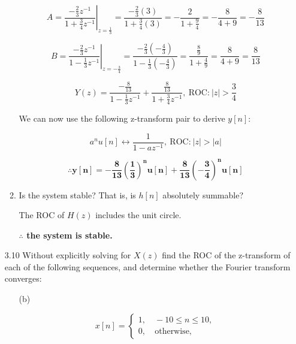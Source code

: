 \documentclass[fleqn]{article}
\begin{document}
\begin{enumerate}[nolistsep]
\begin{enumerate}[nolistsep]
				\begin{equation*}
					A = \left.\frac{-\frac{2}{3}z^{-1}}{1 + \frac{3}{4}z^{-1}}\right\vert_{z = \frac{1}{3}} = \frac{-\frac{2}{3}(3)}{1 + \frac{3}{4}(3)} = -\frac{2}{1 + \frac{9}{4}} = -\frac{8}{4 + 9} = -\frac{8}{13}
				\end{equation*}
					
				\begin{equation*}
					B = \left.\frac{-\frac{2}{3}z^{-1}}{1 - \frac{1}{3}z^{-1}}\right\vert_{z = -\frac{3}{4}} = \frac{-\frac{2}{3}\left(-\frac{4}{3}\right)}{1 - \frac{1}{3}\left(-\frac{4}{3}\right)} = \frac{\frac{8}{9}}{1 + \frac{4}{9}} = \frac{8}{4 + 9} = \frac{8}{13}
				\end{equation*}
				
				\pagebreak
				\begin{equation*}
					Y(z) = \frac{-\frac{8}{13}}{1 - \frac{1}{3}z^{-1}} + \frac{\frac{8}{13}}{1 + \frac{3}{4}z^{-1}},\ \text{ROC:}\ |z| > \frac{3}{4}
				\end{equation*}
				
				We can now use the following z-transform pair to derive $y[n]$:
				
				\begin{equation*}
					a^nu[n] \leftrightarrow \frac{1}{1 - az^{-1}},\ \text{ROC:}\ |z| > |a| 
				\end{equation*}
				
				\begin{equation*}
					\mathbf{\therefore y[n] = -\frac{8}{13}\left(\frac{1}{3}\right)^nu[n] + \frac{8}{13}\left(-\frac{3}{4}\right)^nu[n]}
				\end{equation*}
				
				
			\item Is the system stable? That is, is $h[n]$ absolutely summable?
			
				The ROC of $H(z)$ includes the unit circle.
				
				\textbf{$\mathbf{\therefore}$ the system is stable.}
		\end{enumerate}
		
				
		\item [3.10] Without explicitly solving for $X(z)$ find the ROC of the z-transform of each of the following sequences, and determine whether the Fourier transform converges:
		
			\begin{enumerate}[nolistsep]
				\item [(b)]

					\begin{equation*}				
						x[n] = \left\{\begin{aligned} 1,& \ -10 \leq n \leq 10, \\ 
						0,& \ \text{otherwise}, \end{aligned}\right.
					\end{equation*}
					

\end{enumerate}
\end{enumerate}
\end{document}
